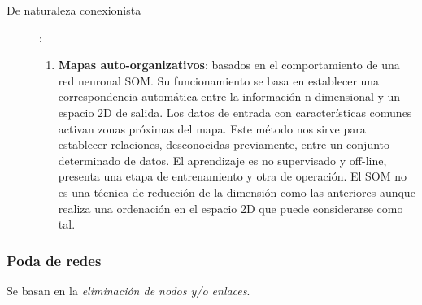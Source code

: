 \documentclass[10pt,spanish, landscape, twocolumn]{article}
\begin{document}
\begin{description}
    \item[De naturaleza conexionista]:
    \begin{enumerate}[\color{temacuatro}{$\heartsuit$}]
        \item \textbf{\textcolor{temacuatro}{Mapas auto-organizativos}}: basados en el comportamiento de una red neuronal SOM. Su funcionamiento se basa en establecer una correspondencia automática entre la información n-dimensional y un espacio 2D de salida. Los datos de entrada con características comunes activan zonas próximas del mapa. Este método nos sirve para establecer relaciones, desconocidas previamente, entre un conjunto determinado de datos. El aprendizaje es no supervisado y off-line, presenta una etapa de entrenamiento y otra de operación. El SOM no es una técnica de reducción de la dimensión como las anteriores aunque realiza una ordenación en el espacio 2D que puede considerarse como tal.
    \end{enumerate}
\end{description}

\subsubsection{\textcolor{temacuatro}Poda de redes}
Se basan en la \textit{\textcolor{temacuatro}{eliminación de nodos y/o enlaces}}.
\end{document}
